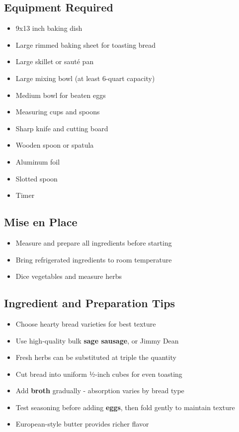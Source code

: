 \documentclass[11pt,letterpaper]{article}
\begin{document}
{\small
\setlength{\columnsep}{20pt}
\setlength{\multicolsep}{6pt}
\begin{multicols}{2}
\setlength{\parindent}{0pt}
\setlength{\parskip}{4pt}

\subsection*{Equipment Required}
\begin{itemize}
    \item 9x13 inch baking dish
    \item Large rimmed baking sheet for toasting bread
    \item Large skillet or sauté pan
    \item Large mixing bowl (at least 6-quart capacity)
    \item Medium bowl for beaten eggs
    \item Measuring cups and spoons
    \item Sharp knife and cutting board
    \item Wooden spoon or spatula
    \item Aluminum foil
    \item Slotted spoon
    \item Timer
\end{itemize}

\subsection*{Mise en Place}
\begin{itemize}
    \item Measure and prepare all ingredients before starting
    \item Bring refrigerated ingredients to room temperature
    \item Dice vegetables and measure herbs
\end{itemize}

\subsection*{Ingredient and Preparation Tips}
\begin{itemize}
    \item Choose hearty bread varieties for best texture
    \item Use high-quality bulk \textbf{sage sausage}, or Jimmy Dean
    \item Fresh herbs can be substituted at triple the quantity
    \item Cut bread into uniform ½-inch cubes for even toasting
    \item Add \textbf{broth} gradually - absorption varies by bread type
    \item Test seasoning before adding \textbf{eggs}, then fold gently to maintain texture
    \item European-style butter provides richer flavor
\end{itemize}


\end{multicols}}
\end{document}
